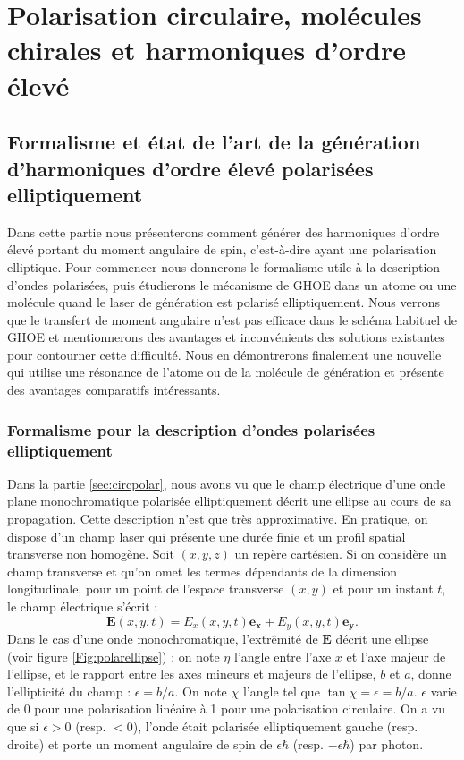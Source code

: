 \part{Polarisation circulaire, molécules chirales et harmoniques d'ordre élevé}
\label{PA:Spin_HHG}
\chapter{Formalisme et état de l'art de la génération d'harmoniques d'ordre élevé polarisées elliptiquement}
Dans cette partie nous présenterons comment générer des harmoniques d'ordre élevé portant du moment angulaire de spin, c'est-à-dire ayant une polarisation elliptique. Pour commencer nous donnerons le formalisme utile à la description d'ondes polarisées, puis étudierons le mécanisme de GHOE dans un atome ou une molécule quand le laser de génération est polarisé elliptiquement. Nous verrons que le transfert de moment angulaire n'est pas efficace dans le schéma habituel de GHOE et mentionnerons des avantages et inconvénients des solutions existantes pour contourner cette difficulté. Nous en démontrerons finalement une nouvelle qui utilise une résonance de l'atome ou de la molécule de génération et présente des avantages comparatifs intéressants.

\section{Formalisme pour la description d'ondes polarisées elliptiquement}
\label{sec:polardef}
Dans la partie \ref{sec:circpolar}, nous avons vu que le champ électrique d'une onde plane monochromatique polarisée elliptiquement décrit une ellipse au cours de sa propagation. Cette description n'est que très approximative.
En pratique, on dispose d'un champ laser qui présente une durée finie et un profil spatial transverse non homogène. Soit $(x,y,z)$ un repère cartésien. Si on considère un champ transverse et qu'on omet les termes dépendants de la dimension longitudinale, pour un point de l'espace transverse $(x,y)$ et pour un instant $t$, le champ électrique s'écrit :
\begin{equation}
\bm{E}(x,y,t) = E_x(x,y,t) \bm{e_x} + E_y(x,y,t) \bm{e_y}.
\label{eq:eqstokes1}
\end{equation}
Dans le cas d'une onde monochromatique, l'extrêmité de $\bm{E}$ décrit une ellipse (voir figure \ref{Fig:polarellipse}) : on note $\eta$ l'angle entre l'axe $x$ et l'axe majeur de l'ellipse, et le rapport entre les axes mineurs et majeurs de l'ellipse, $b$ et $a$, donne l'ellipticité du champ : $\epsilon = b/a$. On note $\chi$ l'angle tel que $\tan\chi = \epsilon = b/a$. $\epsilon$ varie de 0 pour une polarisation linéaire à 1 pour une polarisation circulaire.  On a vu que si $\epsilon>0$ (resp. $<0$), l'onde était polarisée elliptiquement gauche (resp. droite) et porte un moment angulaire de spin de $\epsilon\hbar$ (resp. $-\epsilon\hbar$) par photon.


